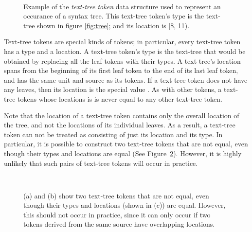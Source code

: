 \documentclass[11pt]{article}
\begin{document}
  \begin{figure}
  \begin{centering}
    \\
  \end{centering}

   \caption{Example of the \emph{text-tree token} data structure used
   to represent an occurance of a syntax tree.  This text-tree token's
   type is the text-tree shown in figure \ref{fig:tree}; and its
   location is [8, 11).}

  \label{fig:treetoken}
  \end{figure}

  Text-tree tokens are special kinds of tokens; in particular, every
  text-tree token has a type and a location.  A text-tree token's type
  is the text-tree that would be obtained by replacing all the leaf
  tokens with their types.  A text-tree's location spans from the
  beginning of its first leaf token to the end of its last leaf token,
  and has the same unit and source as its tokens.  If a text-tree
  token does not have any leaves, then its location is the special
  value .  As with other tokens, a text-tree tokens whose
  locations is  is never equal to any other text-tree
  token.

  Note that the location of a text-tree token contains only the overall
  location of the tree, and not the locations of its individual
  leaves.  As a result, a text-tree token can not be treated as consisting
  of just its location and its type.  In particular, it is possible to
  construct two text-tree tokens that are not equal, even though their
  types and locations are equal (See Figure~\ref{fig:badtree}).
  However, it is highly unlikely that such pairs of text-tree tokens will
  occur in practice.

  \begin{figure}[b]
  \begin{centering}
    \\
  \end{centering}

   \caption{(a) and (b) show two text-tree tokens that are not equal,
   even though their types and locations (shown in (c)) are equal.
   However, this should not occur in practice, since it can only occur
   if two tokens derived from the same source have overlapping
   locations.}
  \label{fig:badtree}
  \end{figure}
\end{document}

